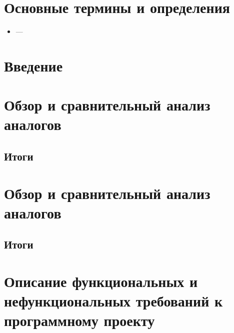 \documentclass[allcolors=black]{article}
\begin{document}
\makeTitlePage

\tableofcontents

\section{Основные термины и определения}
\begin{itemize}
    \item \textit{} --- 
\end{itemize}

\section{Введение}

\section{Обзор и сравнительный анализ аналогов}

\subsubsection*{}

\subsection*{Итоги}

\section{Обзор и сравнительный анализ аналогов}

\subsubsection*{}

\subsection*{Итоги}

\section{Описание функциональных и нефункциональных требований к программному проекту}
\end{document}
